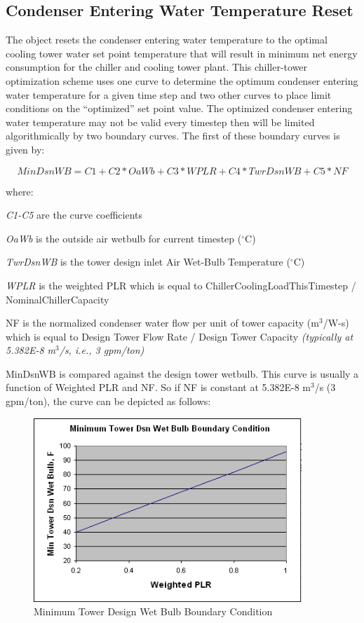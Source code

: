 \subsection{Condenser Entering Water Temperature Reset}\label{condenser-entering-water-temperature-reset}

The object resets the condenser entering water temperature to the optimal cooling tower water set point temperature that will result in minimum net energy consumption for the chiller and cooling tower plant. This chiller-tower optimization scheme uses one curve to determine the optimum condenser entering water temperature for a given time step and two other curves to place limit conditions on the ``optimized'' set point value. The optimized condenser entering water temperature may not be valid every timestep then will be limited algorithmically by two boundary curves. The first of these boundary curves is given by:

\begin{equation}
MinDsnWB = C1 + C2*OaWb + C3*WPLR + C4*TwrDsnWB + C5*NF
\end{equation}


where:

\emph{C1-C5} are the curve coefficients

\emph{OaWb} is the outside air wetbulb for current timestep (\(^{\circ}\)C)

\emph{TwrDsnWB} is the tower design inlet Air Wet-Bulb Temperature (\(^{\circ}\)C)

\emph{WPLR} is the weighted PLR which is equal to ChillerCoolingLoadThisTimestep / NominalChillerCapacity

NF is the normalized condenser water flow per unit of tower capacity (m\(^3\)/W-s) which is equal to Design Tower Flow Rate / Design Tower Capacity \emph{(typically at 5.382E-8 m\(^3\)/s, i.e., 3 gpm/ton)}

MinDsnWB is compared against the design tower wetbulb. This curve is usually a function of Weighted PLR and NF. So if NF is constant at 5.382E-8 m\(^3\)/s (3 gpm/ton), the curve can be depicted as follows:

\begin{figure}[hbtp] %
\centering
\includegraphics[width=0.9\textwidth, height=0.9\textheight, keepaspectratio=true]{media/image6482.png}
\caption{Minimum Tower Design Wet Bulb Boundary Condition \protect \label{fig:minimum-tower-design-wet-bulb-boundary}}
\end{figure}

